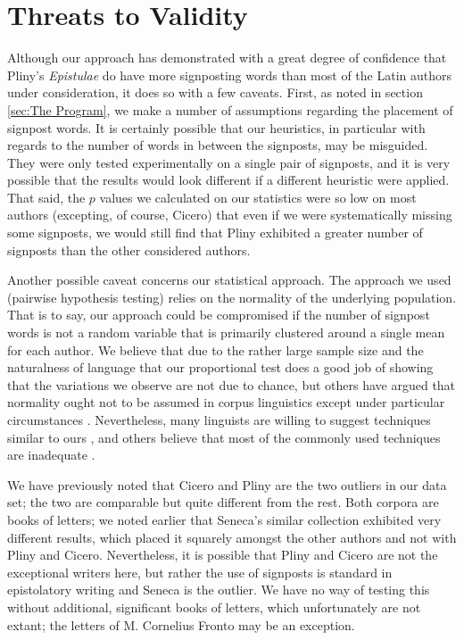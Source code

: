\section{Threats to Validity}
\label{sec:Threats to Validity}

Although our approach has demonstrated with a great degree of confidence that Pliny's \textit{Epistulae} do have more signposting words than most of the Latin authors under consideration, it does so with a few caveats. First, as noted in section \ref{sec:The Program}, we make a number of assumptions regarding the placement of signpost words. It is certainly possible that our heuristics, in particular with regards to the number of words in between the signposts, may be misguided. They were only tested experimentally on a single pair of signposts, and it is very possible that the results would look different if a different heuristic were applied. That said, the $p$ values we calculated on our statistics were so low on most authors (excepting, of course, Cicero) that even if we were systematically missing some signposts, we would still find that Pliny exhibited a greater number of signposts than the other considered authors.

Another possible caveat concerns our statistical approach. The approach we used (pairwise hypothesis testing) relies on the normality of the underlying population. That is to say, our approach could be compromised if the number of signpost words is not a random variable that is primarily clustered around a single mean for each author. We believe that due to the rather large sample size and the naturalness of language that our proportional test does a good job of showing that the variations we observe are not due to chance, but others have argued that normality ought not to be assumed in corpus linguistics except under particular circumstances \cite{chi2}. Nevertheless, many linguists are willing to suggest techniques similar to ours \cite{gries}, and others believe that most of the commonly used techniques are inadequate \cite{bestgen}.

We have previously noted that Cicero and Pliny are the two outliers in our data set; the two are comparable but quite different from the rest. Both corpora are books of letters; we noted earlier that Seneca's similar collection exhibited very different results, which placed it squarely amongst the other authors and not with Pliny and Cicero. Nevertheless, it is possible that Pliny and Cicero are not the exceptional writers here, but rather the use of signposts is standard in epistolatory writing and Seneca is the outlier. We have no way of testing this without additional, significant books of letters, which unfortunately are not extant; the letters of M. Cornelius Fronto may be an exception.

